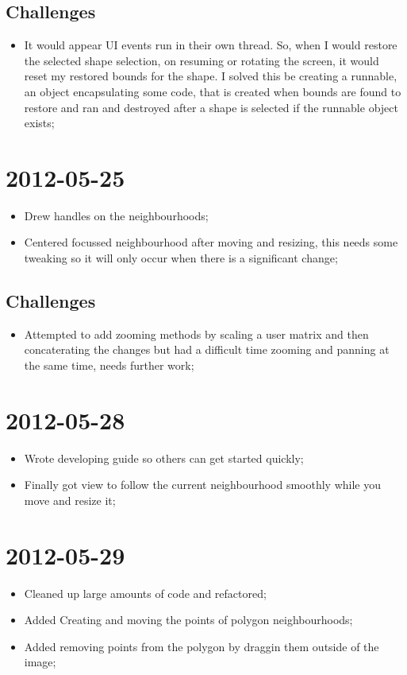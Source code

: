 \documentclass{report}
\begin{document}
\subsection*{Challenges}
\begin{itemize}
  \item 
    It would appear UI events run in their own thread. So, when I would restore the selected shape selection, on resuming or rotating the screen, it would reset my restored bounds for the shape. I solved this be creating a runnable, an object encapsulating some code, that is created when bounds are found to restore and ran and destroyed after a shape is selected if the runnable object exists;
\end{itemize}

\section*{2012-05-25}
\begin{itemize}
  \item 
    Drew handles on the neighbourhoods;
  \item
    Centered focussed neighbourhood after moving and resizing, this needs some tweaking so it will only occur when there is a significant change;
\end{itemize}
\subsection*{Challenges}
\begin{itemize}
  \item 
    Attempted to add zooming methods by scaling a user matrix and then concaterating the changes but had a difficult time zooming and panning at the same time, needs further work;
\end{itemize}

\section*{2012-05-28}
\begin{itemize}
  \item 
    Wrote developing guide so others can get started quickly;
  \item
    Finally got view to follow the current neighbourhood smoothly while you move and resize it;
\end{itemize}

\section*{2012-05-29}
\begin{itemize}
  \item 
    Cleaned up large amounts of code and refactored;
  \item
    Added Creating and moving the points of polygon neighbourhoods;
  \item
    Added removing points from the polygon by draggin them outside of the image;
\end{itemize}
\end{document}
